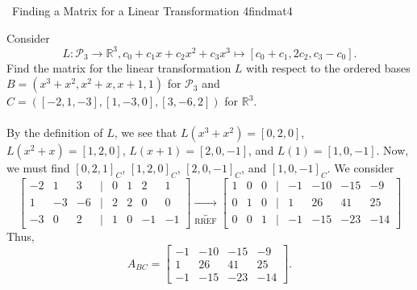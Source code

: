         \begin{example}{\Difficulty\,\Difficulty\,\,Finding a Matrix for a Linear Transformation 4}{findmat4}
            
            Consider
            \begin{equation*}
                L:\mathcal{P}_3\to\mathbb{R}^3, c_0+c_1x+c_2x^2+c_3x^3\mapsto[c_0+c_1,2c_2,c_3-c_0].
            \end{equation*}
            Find the matrix for the linear transformation \(L\) with respect to the ordered bases \(B=(x^3+x^2,x^2+x,x+1,1)\) for \(\mathcal{P}_{3}\) and \(C=([-2,1,-3],[1,-3,0],[3,-6,2])\) for \(\mathbb{R}^3\).
            \\
            \\
            By the definition of \(L\), we see that \(L(x^3+x^2)=[0,2,0]\), \(L(x^2+x)=[1,2,0]\), \(L(x+1)=[2,0,-1]\), and \(L(1)=[1,0,-1]\). Now, we must find \([0,2,1]_C\), \([1,2,0]_C\), \([2,0,-1]_C\), and \([1,0,-1]_C\). We consider
            \begin{equation*}
                \begin{bmatrix}
                    -2 & 1 & 3 & | & 0 & 1 & 2 & 1 \\
                    1 & -3 & -6 & | & 2 & 2 & 0 & 0 \\
                    -3 & 0 & 2 & | & 1 & 0 & -1 & -1
                \end{bmatrix}\underbrace{\to}_{\text{RREF}}\begin{bmatrix}
                    1 & 0 & 0 & | & -1 & -10 & -15 & -9 \\
                    0 & 1 & 0 & | & 1 & 26 & 41 & 25 \\
                    0 & 0 & 1 & | & -1 & -15 & -23 & -14
                \end{bmatrix}
            \end{equation*}
            Thus,
            \begin{equation*}
                A_{BC}=\begin{bmatrix}
                    -1 & -10 & -15 & -9 \\
                    1 & 26 & 41 & 25 \\
                    -1 & -15 & -23 & -14
                \end{bmatrix}.
            \end{equation*}
            
        \end{example}
        \pagebreak
        \vphantom
